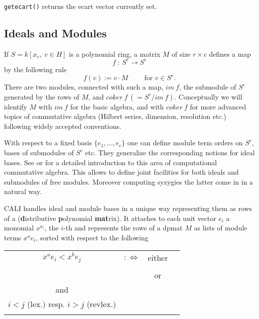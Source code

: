 \noindent \verb|getecart()| returns the ecart vector
currently set.


\subsection{Ideals and Modules}

If $S=k[x_v,\ v \in H]$ is a polynomial ring, a matrix $M$ of size
$r\times c$ defines a map
\[f\ :\ S^r \longrightarrow S^c\]
by the following rule
\[ f(v):=v\cdot M \qquad \mbox{ for } v \in S^r.\]
There are two modules, connected with such a map, $im\ f$, the
submodule of $S^c$ generated by the rows of $M$, and $coker\ f\
(=S^c/im\ f)$. Conceptually we will identify $M$ with $im\ f$ for the
basic algebra, and with $coker\ f$ for more advanced topics of
commutative algebra (Hilbert series, dimension, resolution etc.)
following widely accepted conventions.

With respect to a fixed basis $\{e_1,\ldots ,e_c\}$ one can define
module term orders on $S^c$, \gr bases of submodules of $S^c$ etc.
They generalize the corresponding notions for ideal bases. See
\cite{E} or \cite{MM} for a detailed introduction to this area of
computational commutative algebra. This allows to define joint
facilities for both ideals and submodules of free modules. Moreover
computing syzygies the latter come in in a natural way.

CALI handles ideal and module bases in a unique way representing them
as rows of a \ind{dpmat} ({\bf d}istributive {\bf p}olynomial {\bf
mat}rix). It attaches to each unit vector $e_i$ a monomial $x^{a_i}$,
the $i$-th \ind{column degree} and represents the rows of a dpmat $M$
as lists of module terms $x^ae_i$, sorted with respect to the
following 
\bigskip

\begin{tabular}{cccp{6cm}}
$x^ae_i<x^be_j$ & $:\Leftrightarrow$ & either &
{\centering $x^ax^{a_i}<x^bx^{a_j}$ in $S$\\}\\ 
& & or &
{\centering $x^ax^{a_i}=x^bx^{a_j}$ \\ and \\
$i<j$ (lex.) resp. $i>j$ (revlex.)\\}
\end{tabular}


